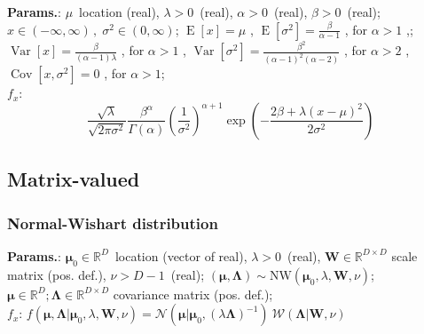     {\color{darkblue} \textbf{Params.}:} {$\mu\,$ location (real),  $\lambda > 0\,$ (real),  $\alpha > 0\,$ (real),  $\beta > 0\,$ (real)}; {$x \in (-\infty, \infty)\,\!, \; \sigma^2 \in (0,\infty)$}; {$\operatorname{E}[x] = \mu$ ,  $\operatorname{E}[\sigma^2] = \frac{\beta}{\alpha - 1}$ , for $\alpha >1$ ,}; {$\operatorname{Var}[x] = \frac{\beta}{(\alpha -1)\lambda}$ , for $\alpha > 1$ ,  $\operatorname{Var}[\sigma^2] = \frac{\beta^2}{(\alpha -1)^2(\alpha -2)}$ , for $\alpha > 2$ ,  $\operatorname{Cov}[x, \sigma^2] = 0$ , for $\alpha > 1$};\hspace{0.5cm}\\{\color{darkblue} \textbf{$f_x$}:} {$$\frac{ \sqrt{ \lambda } }{ \sqrt{ 2 \pi \sigma^2 }}
\frac{ \beta^\alpha }{ \Gamma( \alpha ) } 
\left( \frac{1}{\sigma^2 } \right)^{\alpha + 1}
\exp \left( -\frac { 2\beta + \lambda (x - \mu)^2} {2\sigma^2}\right)$$}



    

        
            \subsection{Matrix-valued}

            
    
        
\subsubsection{Normal-Wishart distribution}





    {\color{darkblue} \textbf{Params.}:} {$\boldsymbol\mu_0\in\mathbb{R}^D\,$ location (vector of real),  $\lambda > 0\,$ (real),  $\mathbf{W} \in\mathbb{R}^{D\times D}$ scale matrix (pos. def.),  $\nu > D-1\,$ (real)}; {$ (\boldsymbol\mu,\boldsymbol\Lambda) \sim \mathrm{NW}(\boldsymbol\mu_0,\lambda,\mathbf{W},\nu)$}; {$\boldsymbol\mu\in\mathbb{R}^D ; \boldsymbol\Lambda \in\mathbb{R}^{D\times D}$ covariance matrix (pos. def.)};\hspace{0.5cm}\\{\color{darkblue} \textbf{$f_x$}:} {$f(\boldsymbol\mu,\boldsymbol\Lambda|\boldsymbol\mu_0,\lambda,\mathbf{W},\nu) = \mathcal{N}(\boldsymbol\mu|\boldsymbol\mu_0,(\lambda\boldsymbol\Lambda)^{-1})\ \mathcal{W}(\boldsymbol\Lambda|\mathbf{W},\nu)$}




